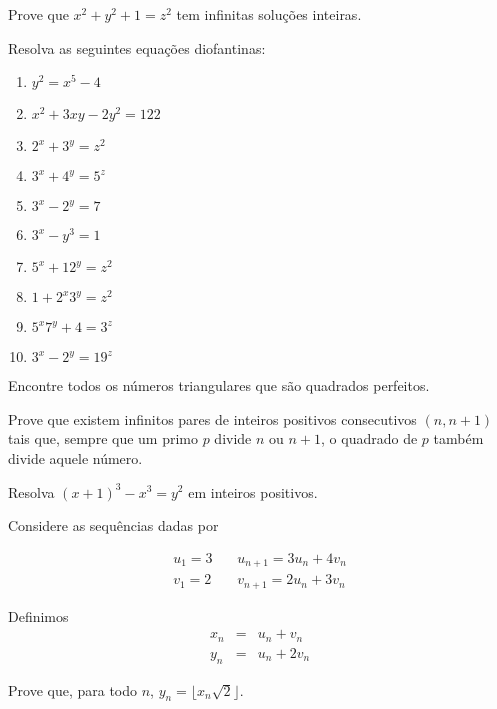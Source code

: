 \begin{questao}
  Prove que $x^2+y^2+1=z^2$ tem infinitas soluções
  inteiras.
\end{questao}

\begin{questao}
  Resolva as seguintes equações diofantinas:

  \begin{enumerate}
    \item $y^2=x^5-4$
    \item $x^2+3xy-2y^2=122$
    \item $2^x+3^y=z^2$
    \item $3^x+4^y=5^z$
    \item $3^x-2^y=7$
    \item $3^x-y^3=1$
    \item $5^x+12^y=z^2$
    \item $1+2^x3^y=z^2$
    \item $5^x7^y+4=3^z$
    \item $3^x-2^y=19^z$
  \end{enumerate}
\end{questao}

\begin{questao}
  Encontre todos os números triangulares que são quadrados
  perfeitos.
\end{questao}

\begin{questao}
  Prove que existem infinitos pares de inteiros positivos
  consecutivos $(n,n+1)$ tais que, sempre que um primo $p$ divide
  $n$ ou $n+1$, o quadrado de $p$ também divide aquele número.
\end{questao}

\begin{questao}
  Resolva $(x+1)^3-x^3=y^2$ em inteiros positivos.
\end{questao}

\begin{questao}
  Considere as sequências dadas por

  \begin{eqnarray*}
    u_1 = 3 &\,& u_{n+1} = 3u_n+4v_n \\
    v_1 = 2 &\,& v_{n+1} = 2u_n+3v_n
  \end{eqnarray*}

  Definimos
  \begin{eqnarray*}
    x_{n} &=& u_n+v_n \\
    y_{n} &=& u_n+2v_n
  \end{eqnarray*}

  Prove que, para todo $n$, $y_n=\lfloor x_n\sqrt{2} \rfloor$.
\end{questao}

